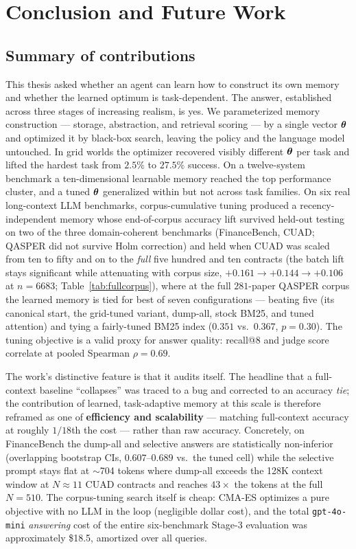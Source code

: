 \chapter{Conclusion and Future Work}
\label{ch:conclusion}

\section{Summary of contributions}
This thesis asked whether an agent can learn how to construct its own memory and
whether the learned optimum is task-dependent. The answer, established across
three stages of increasing realism, is yes. We parameterized memory construction
--- storage, abstraction, and retrieval scoring --- by a single vector
$\boldsymbol{\theta}$ and optimized it by black-box search, leaving the policy and the
language model untouched. In grid worlds the optimizer recovered visibly
different $\boldsymbol{\theta}$ per task and lifted the hardest task from $2.5\%$ to
$27.5\%$ success. On a twelve-system benchmark a ten-dimensional learnable memory
reached the top performance cluster, and a tuned $\boldsymbol{\theta}$ generalized within
but not across task families. On six real long-context LLM benchmarks,
corpus-cumulative tuning produced a recency-independent memory whose
end-of-corpus accuracy lift survived held-out testing on two of the three
domain-coherent benchmarks (FinanceBench, CUAD; QASPER did not survive Holm
correction) and held when CUAD was scaled from ten to fifty and on to the
\emph{full} five hundred and ten contracts (the batch lift stays significant while
attenuating with corpus size, $+0.161 \rightarrow +0.144 \rightarrow +0.106$ at
$n{=}6683$; Table~\ref{tab:fullcorpus}), where at the full $281$-paper QASPER
corpus the learned memory is tied for best of seven configurations --- beating
five (its canonical start, the grid-tuned variant, dump-all, stock BM25, and
tuned attention) and tying a fairly-tuned BM25 index ($0.351$ vs.\ $0.367$,
$p{=}0.30$). The
tuning objective is a valid proxy for answer quality: recall@8 and judge score
correlate at pooled Spearman $\rho=0.69$.

The work's distinctive feature is that it audits itself. The headline that a
full-context baseline ``collapses'' was traced to a bug and corrected to an
accuracy \emph{tie}; the contribution of learned, task-adaptive memory at
this scale is therefore reframed as one of \textbf{efficiency and scalability}
--- matching full-context accuracy at roughly $1/18$th the cost --- rather than
raw accuracy. Concretely, on FinanceBench the dump-all and selective answers are
statistically non-inferior (overlapping bootstrap CIs, $0.607$--$0.689$ vs.\ the
tuned cell) while the selective prompt stays flat at $\sim$704 tokens where
dump-all exceeds the 128K context window at $N{\approx}11$ CUAD contracts and
reaches $43\times$ the tokens at the full $N{=}510$. The corpus-tuning search
itself is cheap: CMA-ES optimizes a pure \recallk{} objective with no LLM in the
loop (negligible dollar cost), and the total \texttt{gpt-4o-mini} \emph{answering}
cost of the entire six-benchmark Stage-3 evaluation was approximately \$18.5,
amortized over all queries.

